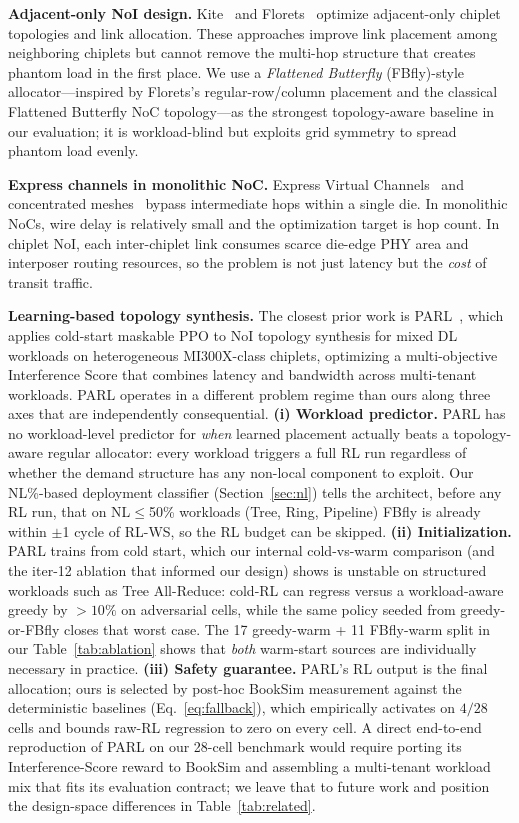 \documentclass[conference]{IEEEtran}
\begin{document}
\textbf{Adjacent-only NoI design.}
Kite~\cite{kite} and Florets~\cite{florets} optimize adjacent-only chiplet topologies and link allocation. These approaches improve link placement among neighboring chiplets but cannot remove the multi-hop structure that creates phantom load in the first place. We use a \textit{Flattened Butterfly} (FBfly)-style allocator---inspired by Florets's regular-row/column placement and the classical Flattened Butterfly NoC topology---as the strongest topology-aware baseline in our evaluation; it is workload-blind but exploits grid symmetry to spread phantom load evenly.

\textbf{Express channels in monolithic NoC.}
Express Virtual Channels~\cite{express_vc} and concentrated meshes~\cite{cmesh} bypass intermediate hops within a single die. In monolithic NoCs, wire delay is relatively small and the optimization target is hop count. In chiplet NoI, each inter-chiplet link consumes scarce die-edge PHY area and interposer routing resources, so the problem is not just latency but the \textit{cost} of transit traffic.

\textbf{Learning-based topology synthesis.}
The closest prior work is PARL~\cite{parl}, which applies cold-start maskable PPO to NoI topology synthesis for mixed DL workloads on heterogeneous MI300X-class chiplets, optimizing a multi-objective Interference Score that combines latency and bandwidth across multi-tenant workloads. PARL operates in a different problem regime than ours along three axes that are independently consequential. \textbf{(i) Workload predictor.} PARL has no workload-level predictor for \textit{when} learned placement actually beats a topology-aware regular allocator: every workload triggers a full RL run regardless of whether the demand structure has any non-local component to exploit. Our NL\%-based deployment classifier (Section~\ref{sec:nl}) tells the architect, before any RL run, that on NL$\le$50\% workloads (Tree, Ring, Pipeline) FBfly is already within $\pm$1 cycle of RL-WS, so the RL budget can be skipped. \textbf{(ii) Initialization.} PARL trains from cold start, which our internal cold-vs-warm comparison (and the iter-12 ablation that informed our design) shows is unstable on structured workloads such as Tree All-Reduce: cold-RL can regress versus a workload-aware greedy by $>10\%$ on adversarial cells, while the same policy seeded from greedy-or-FBfly closes that worst case. The 17 greedy-warm + 11 FBfly-warm split in our Table~\ref{tab:ablation} shows that \textit{both} warm-start sources are individually necessary in practice. \textbf{(iii) Safety guarantee.} PARL's RL output is the final allocation; ours is selected by post-hoc BookSim measurement against the deterministic baselines (Eq.~\ref{eq:fallback}), which empirically activates on $4/28$ cells and bounds raw-RL regression to zero on every cell. A direct end-to-end reproduction of PARL on our 28-cell benchmark would require porting its Interference-Score reward to BookSim and assembling a multi-tenant workload mix that fits its evaluation contract; we leave that to future work and position the design-space differences in Table~\ref{tab:related}.
\end{document}
